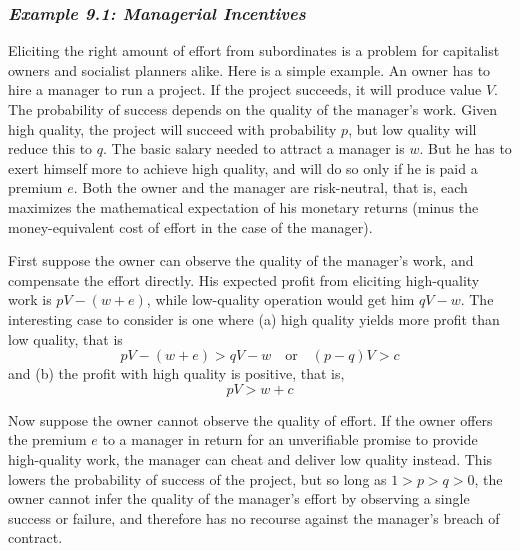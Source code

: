 \subsubsection*{\textit{Example 9.1: Managerial Incentives}}

Eliciting the right amount of effort from subordinates is a problem for capitalist owners and socialist planners alike. Here is a simple example. An owner has to hire a manager to run a project. If the project succeeds, it will produce value $V$. The probability of success depends on the quality of the manager's work. Given high quality, the project will succeed with probability $p$, but low quality will reduce this to $q$. The basic salary needed to attract a manager is $w$. But he has to exert himself  more to achieve high quality, and will do so only if he is paid a premium $e$. Both the owner and the manager are risk-neutral, that is, each maximizes the mathematical expectation of his monetary returns (minus the money-equivalent cost of effort in the case of the manager).

First suppose the owner can observe the quality of the manager's work, and compensate the effort directly. His expected profit from eliciting high-quality work is $pV - (w+e)$, while low-quality operation would get him $qV-w$. The interesting case to consider is one where (a) high quality yields more profit than low quality, that is
\begin{equation} \label{equa9.15}
pV - (w+e) > qV -w \quad \mbox{or} \quad (p-q)V >c
\end{equation}
and (b) the profit with high quality is positive, that is,
\begin{equation} \label{equa9.16}
pV >w+c
\end{equation}

Now suppose the owner cannot observe the quality of effort. If the owner offers the premium $e$ to a manager in return for an unverifiable promise to provide high-quality work, the manager can cheat and deliver low quality instead. This lowers the probability of success of the project, but so long as $1>p>q>0  $, the owner cannot infer the quality of the manager's effort by observing a single success or failure, and therefore has no recourse against the manager's breach of contract.

